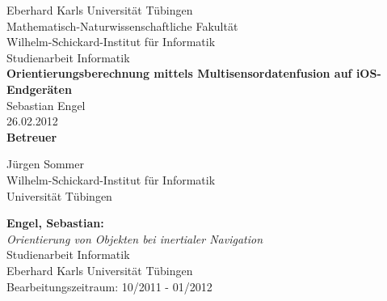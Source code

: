 \documentclass[twoside,12pt,a4paper]{report}
\begin{document}
\setlength\parindent{0pt} 


 
\begin{titlepage}
	\begin{center}
  		{\LARGE Eberhard Karls Universität Tübingen}\\
		{\large Mathematisch-Naturwissenschaftliche Fakultät \\
		Wilhelm-Schickard-Institut für Informatik\\[4cm]}
  		{\huge Studienarbeit Informatik\\[2cm]}
  		{\Large\bf  Orientierungsberechnung mittels Multisensordatenfusion auf iOS-Endgeräten\\[1.5cm]}
 		{\large Sebastian Engel}\\[0.5cm]
		26.02.2012 \\[4cm]
		{\small\bf Betreuer}\\[0.5cm]
  		\parbox{7cm}{
  			\begin{center}
				{\large Jürgen Sommer}\\
	  			{\footnotesize Wilhelm-Schickard-Institut für Informatik\\
				Universität Tübingen}
			\end{center}
 		}
 	\end{center}
\end{titlepage}


\thispagestyle{empty}
\vspace*{\fill}
\begin{minipage}{11.2cm}
\textbf{Engel, Sebastian:}\\
\emph{Orientierung von Objekten bei inertialer Navigation}\\ Studienarbeit Informatik\\
Eberhard Karls Universität Tübingen\\
Bearbeitungszeitraum: 10/2011 - 01/2012
\end{minipage}
\newpage


\setcounter{page}{1}
\end{document}
